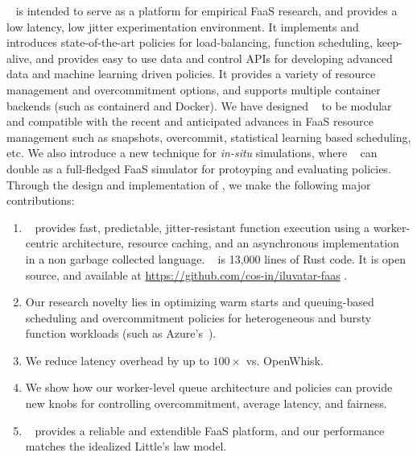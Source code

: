 \sysname~ is intended to serve as a platform for empirical FaaS research, and provides a low latency, low jitter experimentation environment.
It implements and introduces state-of-the-art policies for load-balancing, function scheduling, keep-alive, and provides easy to use data and control APIs for developing advanced data and machine learning driven policies. 
It provides a variety of resource management and overcommitment options, and supports multiple container backends (such as containerd and Docker). 
We have designed \sysname~ to be modular and compatible with the recent and anticipated advances in FaaS resource management such as snapshots, overcommit, statistical learning based scheduling, etc. 
We also introduce a new technique for \emph{in-situ} simulations, where \sysname~ can double as a full-fledged  FaaS simulator for protoyping and evaluating policies.  
%
Through the design and implementation of \sysname, we make the following major contributions: 
\begin{enumerate}[wide,labelwidth=!,labelindent=0pt,topsep=0pt,itemsep=-1ex,partopsep=1ex,parsep=1ex]
\item \sysname~ provides fast, predictable, jitter-resistant function execution using a worker-centric architecture, resource caching, and an asynchronous implementation in a non garbage collected language.  \sysname~ is 13,000 lines of Rust code. It is open source, and available at \url{https://github.com/cos-in/iluvatar-faas} . 
\item Our research novelty lies in optimizing warm starts and queuing-based scheduling and overcommitment policies for heterogeneous and bursty function workloads (such as Azure's~\cite{shahrad_serverless_2020}). 
\item We reduce latency overhead by up to $100\times$ vs. OpenWhisk. 
\item We show how our worker-level queue architecture and policies can provide new knobs for controlling overcommitment, average latency, and fairness. 
\item \sysname~ provides a reliable and extendible FaaS platform, and our performance matches the idealized Little's law model. 
\end{enumerate}


